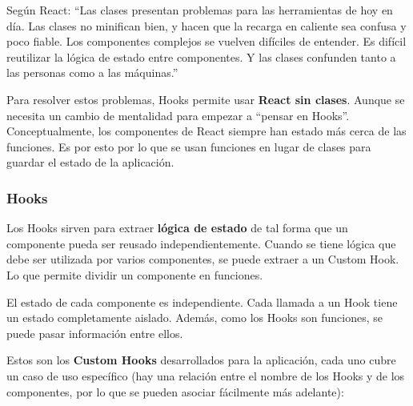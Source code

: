 \documentclass[12pt,twoside,titlepage]{report}
\begin{document}
Según React: ``Las clases presentan problemas para las herramientas de hoy en día. Las clases no minifican bien, y hacen que la recarga en caliente sea confusa y poco fiable. Los componentes complejos se vuelven difíciles de entender. Es difícil reutilizar la lógica de estado entre componentes. Y las clases confunden tanto a las personas como a las máquinas.'' 

Para resolver estos problemas, Hooks permite usar \textbf{React sin clases}. Aunque se necesita un cambio de mentalidad para empezar a “pensar en Hooks”. Conceptualmente, los componentes de React siempre han estado más cerca de las funciones. Es por esto por lo que se usan funciones en lugar de clases para guardar el estado de la aplicación.
\cite{hooks1}

\subsubsection{Hooks}

Los Hooks sirven para extraer \textbf{lógica de estado} de tal forma que un componente pueda ser reusado independientemente. Cuando se tiene lógica que debe ser utilizada por varios componentes, se puede extraer a un Custom Hook. Lo que permite dividir un componente en funciones.
\cite{hooks3}

El estado de cada componente es independiente. Cada llamada a un Hook tiene un estado completamente aislado. Además, como los Hooks son funciones, se puede pasar información entre ellos.
\cite{hooks2}

Estos son los \textbf{Custom Hooks} desarrollados para la aplicación, cada uno cubre un caso de uso específico (hay una relación entre el nombre de los Hooks y de los componentes, por lo que se pueden asociar fácilmente más adelante):

\end{document}
